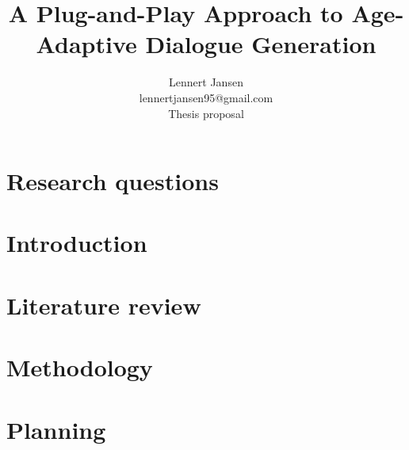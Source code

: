 \documentclass{article}
\title{A Plug-and-Play Approach to Age-Adaptive Dialogue Generation}
\author{%
  Lennert Jansen\\
  lennertjansen95@gmail.com \\
  Thesis proposal
}
\begin{document}
 
\maketitle

\tableofcontents

\newpage
\section{Research questions}


\newpage
\section{Introduction}


\section{Literature review}


\section{Methodology}
\label{sec:methods}



% 


\section{Planning}
\label{sec:plan}


\newpage


\end{document}
